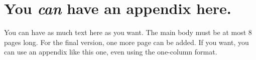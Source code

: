 \documentclass[nohyperref]{article}
\theoremstyle{plain}
\theoremstyle{definition}
\theoremstyle{remark}
\begin{document}
\section{You \emph{can} have an appendix here.}

You can have as much text here as you want. The main body must be at most $8$ pages long.
For the final version, one more page can be added.
If you want, you can use an appendix like this one, even using the one-column format.
\end{document}
